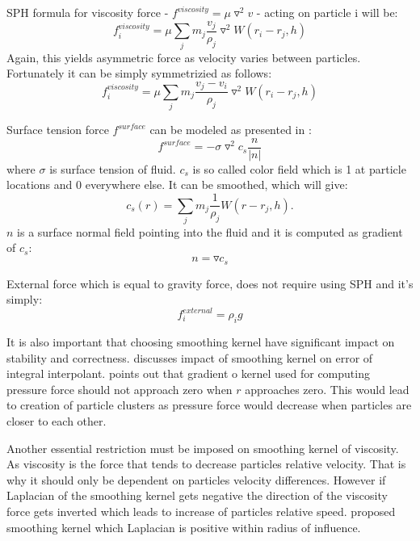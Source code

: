 SPH formula for viscosity force - $f^{viscosity} =  \mu \triangledown^2v$ - acting on particle i will be:
\begin{equation}
\label{eq:sph_viscosity_force}
f^{viscosity}_i = \mu \sum_{j}m_j \frac{v_j}{\rho_j}\triangledown^2 W(r_i - r_j, h) 
\end{equation}
Again, this yields asymmetric force as velocity varies between particles. Fortunately it can be simply symmetrizied as follows:
\begin{equation}
\label{eq:sph_viscosity_force_sym}
f^{viscosity}_i = \mu \sum_{j}m_j \frac{v_j - v_i}{\rho_j}\triangledown^2 W(r_i - r_j, h) 
\end{equation}

Surface tension force $f^{surface}$ can be modeled as presented in \cite{Muller2003}:
\begin{equation}
\label{eq:surface_tension}
f^{surface} = -\sigma \triangledown^2 c_s \frac{n}{|n|}
\end{equation}
where $\sigma$ is surface tension of fluid. $c_s$ is so called color field which is 1 at particle locations and 0 everywhere else. It can be smoothed, which will give:
\begin{equation}
\label{eq:color_field}
c_s(r) = \sum_{j}m_j \frac{1}{\rho_j}W(r-r_j, h).
\end{equation}
$n$ is a surface normal field pointing into the fluid and it is computed as gradient of $c_s$:
\begin{equation}
n = \triangledown c_s
\end{equation}


External force which is equal to gravity force, does not require using SPH and it's simply:
\begin{equation}
f^{external}_i = \rho_i g
\end{equation}

It is also important that choosing smoothing kernel have significant impact on stability and correctness. \cite{Monaghan1992} discusses impact of smoothing kernel on error of integral interpolant. \cite{Muller2003} points out that gradient o kernel used for computing pressure force should not approach zero when $r$ approaches zero. This would lead to creation of particle clusters as pressure force would decrease when particles are closer to each other.

Another essential restriction must be imposed on smoothing kernel of viscosity. As viscosity  is the force that tends to decrease particles relative velocity. That is why it should only be dependent on particles velocity differences. However if Laplacian of the smoothing kernel gets negative the direction of the viscosity force gets inverted which leads to increase of particles relative speed. \cite{Muller2003} proposed smoothing kernel which Laplacian is positive within radius of influence. 

